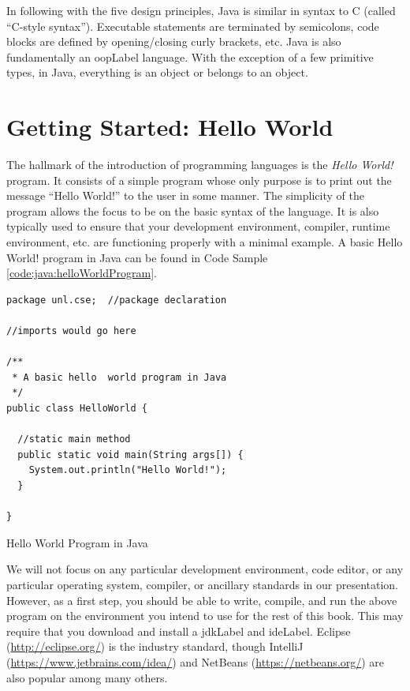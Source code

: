 In following with the five design principles, Java is similar in syntax to
C (called ``C-style syntax'').  Executable statements are terminated
by semicolons, code blocks are defined by opening/closing curly brackets, 
etc.  Java is also fundamentally an \gls{oopLabel} language.
With the exception of a few primitive types, in Java, everything is
an object or belongs to an object.

\section{Getting Started: Hello World}

The hallmark of the introduction of programming languages is the \emph{Hello World!}
program.  It consists of a simple program whose only purpose is to print out the message
``Hello World!'' to the user in some manner.  The simplicity of the program allows the
focus to be on the basic syntax of the language.  It is also typically used to ensure that 
your development environment, compiler, runtime environment, etc. are functioning 
properly with a minimal example.  A basic Hello World! program in Java can be found in 
Code Sample \ref{code:java:helloWorldProgram}.

\begin{listing}
\begin{verbatim}
package unl.cse;  //package declaration

//imports would go here

/**
 * A basic hello  world program in Java
 */
public class HelloWorld {

  //static main method
  public static void main(String args[]) {
    System.out.println("Hello World!");
  }

}
\end{verbatim}
\caption{Hello World Program in Java}
\label{code:java:helloWorldProgram}
\end{listing}

We will not focus on any particular development environment, code editor, or any 
particular operating system, compiler, or ancillary standards in our presentation.  
However, as a first step, you should be able to write, compile, and run the above 
program on the environment you intend to use for the rest of this book.  This may 
require that you download and install a \gls{jdkLabel} and \gls{ideLabel}.  Eclipse
(\url{http://eclipse.org/}) is the industry standard, though IntelliJ (\url{https://www.jetbrains.com/idea/})
and NetBeans (\url{https://netbeans.org/}) are also popular among many others.

